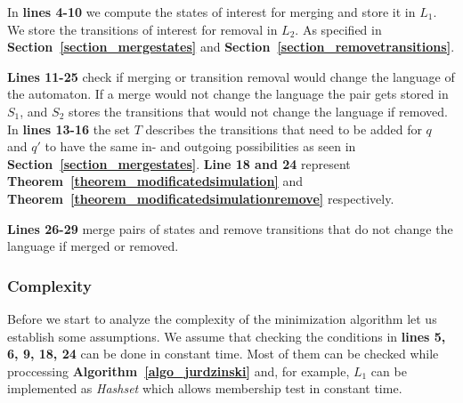 \documentclass[12pt,oneside,bibliography=totoc,abstracton]{scrartcl}
\newcommand{\theoremref}[1]{\textbf{Theorem~\ref{#1}}}
\newcommand{\sectionref}[1]{\textbf{Section~\ref{#1}}}
\newcommand{\algoref}[1]{\textbf{Algorithm~\ref{#1}}}
\begin{document}
In \textbf{lines 4-10} we compute the states of interest for merging and store it in $L_1$.
We store the transitions of interest for removal in $L_2$. As specified in
\sectionref{section_mergestates} and \sectionref{section_removetransitions}.

\textbf{Lines 11-25} check if merging or transition removal would change the language of the automaton.
If a merge would not change the language the pair gets stored in $S_1$, and $S_2$ stores the
transitions that would not change the language if removed.
In \textbf{lines 13-16} the set $T$ describes the transitions that need to be added for
$q$ and $q'$ to have the same in- and outgoing possibilities as seen in \sectionref{section_mergestates}.
\textbf{Line 18 and 24} represent \theoremref{theorem_modificatedsimulation} and
\theoremref{theorem_modificatedsimulationremove} respectively.

\textbf{Lines 26-29} merge pairs of states and remove transitions that do not change the
language if merged or removed.

\subsubsection{Complexity}
Before we start to analyze the complexity of the minimization algorithm let us establish some assumptions.
We assume that checking the conditions in \textbf{lines 5, 6, 9, 18, 24} can be done in constant time.
Most of them can be checked while proccessing \algoref{algo_jurdzinski} and, for example, $L_1$ can be
implemented as \textit{Hashset} which allows membership test in constant time.
\end{document}
